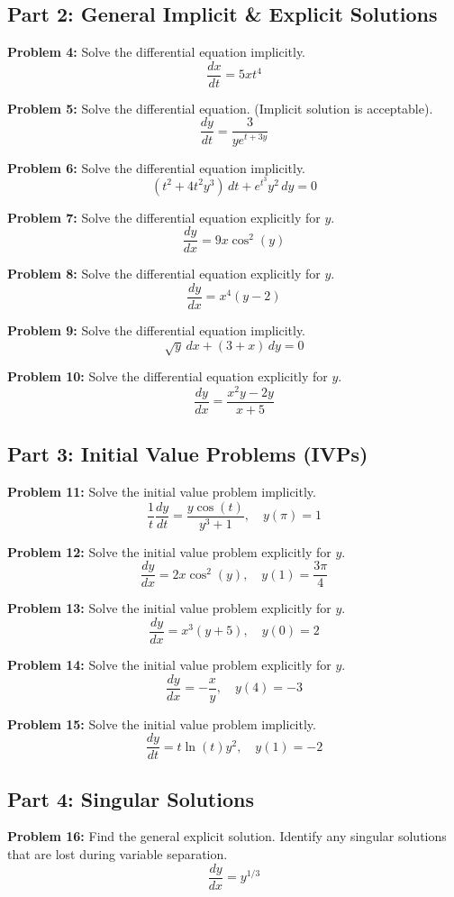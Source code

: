 \documentclass[11pt]{article}
\begin{document}
\subsection*{Part 2: General Implicit \& Explicit Solutions}
\textbf{Problem 4:} Solve the differential equation implicitly.
\[ \frac{dx}{dt} = 5xt^4 \]

\textbf{Problem 5:} Solve the differential equation. (Implicit solution is acceptable).
\[ \frac{dy}{dt} = \frac{3}{y e^{t+3y}} \]

\textbf{Problem 6:} Solve the differential equation implicitly.
\[ (t^2 + 4t^2 y^3) \, dt + e^{t^3} y^2 \, dy = 0 \]

\textbf{Problem 7:} Solve the differential equation explicitly for $y$.
\[ \frac{dy}{dx} = 9x \cos^2(y) \]

\textbf{Problem 8:} Solve the differential equation explicitly for $y$.
\[ \frac{dy}{dx} = x^4(y - 2) \]

\textbf{Problem 9:} Solve the differential equation implicitly.
\[ \sqrt{y} \, dx + (3+x) \, dy = 0 \]

\textbf{Problem 10:} Solve the differential equation explicitly for $y$.
\[ \frac{dy}{dx} = \frac{x^2y - 2y}{x+5} \]

\subsection*{Part 3: Initial Value Problems (IVPs)}
\textbf{Problem 11:} Solve the initial value problem implicitly.
\[ \frac{1}{t} \frac{dy}{dt} = \frac{y \cos(t)}{y^3 + 1}, \quad y(\pi) = 1 \]

\textbf{Problem 12:} Solve the initial value problem explicitly for $y$.
\[ \frac{dy}{dx} = 2x \cos^2(y), \quad y(1) = \frac{3\pi}{4} \]

\textbf{Problem 13:} Solve the initial value problem explicitly for $y$.
\[ \frac{dy}{dx} = x^3(y + 5), \quad y(0) = 2 \]

\textbf{Problem 14:} Solve the initial value problem explicitly for $y$.
\[ \frac{dy}{dx} = -\frac{x}{y}, \quad y(4) = -3 \]

\textbf{Problem 15:} Solve the initial value problem implicitly.
\[ \frac{dy}{dt} = t \ln(t) y^2, \quad y(1) = -2 \]

\subsection*{Part 4: Singular Solutions}
\textbf{Problem 16:} Find the general explicit solution. Identify any singular solutions that are lost during variable separation.
\[ \frac{dy}{dx} = y^{1/3} \]
\end{document}
